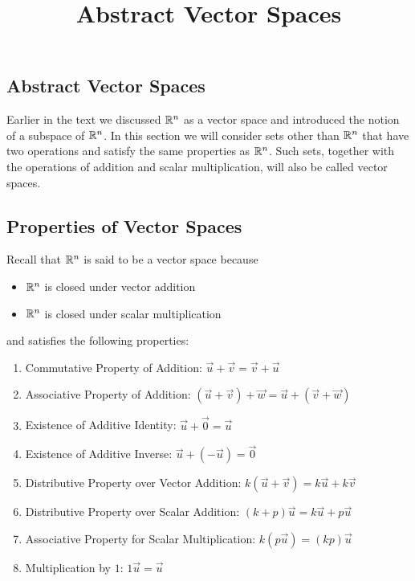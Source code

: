\documentclass{ximera}
\title{Abstract Vector Spaces} \license{CC BY-NC-SA 4.0}
\begin{document}
\begin{abstract}
\end{abstract}
\maketitle

\begin{onlineOnly}
\section*{Abstract Vector Spaces}
\end{onlineOnly}

Earlier in the text we discussed $\mathbb{R}^n$ as a vector space and introduced the notion of a subspace of $\mathbb{R}^n$.  
In this section we will consider sets other than $\mathbb{R}^n$ that have two operations and satisfy the same properties as $\mathbb{R}^n$.  Such sets, together with the operations of addition and scalar multiplication, will also be called vector spaces.

\subsection*{Properties of Vector Spaces} 

Recall that $\mathbb{R}^n$ is said to be a vector space because
\begin{itemize}
    \item[] $\mathbb{R}^n$ is closed under vector addition
    \item[] $\mathbb{R}^n$ is closed under scalar multiplication
\end{itemize}
and satisfies the following properties:

  \begin{enumerate}
  \item 
  Commutative Property of Addition:\quad
  $\vec{u}+\vec{v}=\vec{v}+\vec{u}$
  \item 
  Associative Property of Addition:\quad
  $(\vec{u}+\vec{v})+\vec{w}=\vec{u}+(\vec{v}+\vec{w})$
  \item 
  Existence of Additive Identity:\quad
  $\vec{u}+\vec{0}=\vec{u}$
  \item 
  Existence of Additive Inverse:\quad
  $\vec{u}+(-\vec{u})=\vec{0}$
  \item
  Distributive Property over Vector Addition:\quad
  $k(\vec{u}+\vec{v})=k\vec{u}+k\vec{v}$
  \item
  Distributive Property over Scalar Addition:\quad
  $(k+p)\vec{u}=k\vec{u}+p\vec{u}$
  \item 
  Associative Property for Scalar Multiplication:\quad
  $k(p\vec{u})=(kp)\vec{u}$
  \item 
  Multiplication by $1$:\quad
  $1\vec{u}=\vec{u}$
  \end{enumerate}
\end{document}
